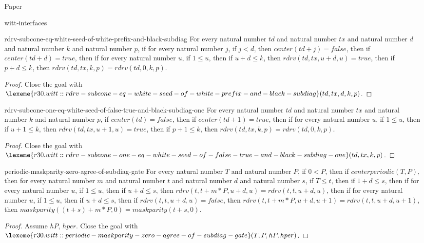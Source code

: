 \begin{lexlean}{Paper}
\begin{section}{witt-interfaces}
  \begin{theorem}{rdrv-subcone-eq-white-seed-of-white-prefix-and-black-subdiag}
  For every natural number \(td\) and natural number \(tx\) and natural number \(d\) and natural number \(k\) and natural number \(p\), if for every natural number \(j\), if \(j < d\), then \(center(td + j) = false\), then if \(center(td + d) = true\), then if for every natural number \(u\), if \(1 ≤ u\), then if \(u + d ≤ k\), then \(rdrv(td, tx, u + d, u) = true\), then if \(p + d ≤ k\), then \(rdrv(td, tx, k, p) = rdrv(td, 0, k, p)\).
  \begin{proof}
  Close the goal with \(\lexeme{r30.witt::rdrv-subcone-eq-white-seed-of-white-prefix-and-black-subdiag}(td, tx, d, k, p)\).
  \end{proof}
  \end{theorem}

  \begin{theorem}{rdrv-subcone-one-eq-white-seed-of-false-true-and-black-subdiag-one}
  For every natural number \(td\) and natural number \(tx\) and natural number \(k\) and natural number \(p\), if \(center(td) = false\), then if \(center(td + 1) = true\), then if for every natural number \(u\), if \(1 ≤ u\), then if \(u + 1 ≤ k\), then \(rdrv(td, tx, u + 1, u) = true\), then if \(p + 1 ≤ k\), then \(rdrv(td, tx, k, p) = rdrv(td, 0, k, p)\).
  \begin{proof}
  Close the goal with \(\lexeme{r30.witt::rdrv-subcone-one-eq-white-seed-of-false-true-and-black-subdiag-one}(td, tx, k, p)\).
  \end{proof}
  \end{theorem}

  \begin{theorem}{periodic-maskparity-zero-agree-of-subdiag-gate}
  For every natural number \(T\) and natural number \(P\), if \(0 < P\), then if \(centerperiodic(T, P)\), then for every natural number \(m\) and natural number \(t\) and natural number \(d\) and natural number \(s\), if \(T ≤ t\), then if \(1 + d ≤ s\), then if for every natural number \(u\), if \(1 ≤ u\), then if \(u + d ≤ s\), then \(rdrv(t, t + m * P, u + d, u) = rdrv(t, t, u + d, u)\), then if for every natural number \(u\), if \(1 ≤ u\), then if \(u + d ≤ s\), then if \(rdrv(t, t, u + d, u) = false\), then \(rdrv(t, t + m * P, u + d, u + 1) = rdrv(t, t, u + d, u + 1)\), then \(maskparity((t + s) + m * P, 0) = maskparity(t + s, 0)\).
  \begin{proof}
  Assume \(hP\), \(hper\).
  Close the goal with \(\lexeme{r30.witt::periodic-maskparity-zero-agree-of-subdiag-gate}(T, P, hP, hper)\).
  \end{proof}
  \end{theorem}


\end{section}
\end{lexlean}
